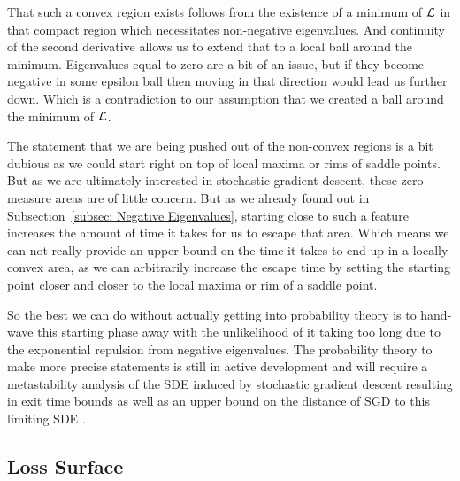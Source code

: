 That such a convex region exists follows from the existence of a minimum of
\(\mathcal{L}\) in that compact region which necessitates non-negative
eigenvalues. And continuity of the second derivative allows us to extend that to 
a local ball around the minimum. Eigenvalues equal to zero
are a bit of an issue, but if they become negative in some epsilon ball
then moving in that direction would lead us further down. Which is a contradiction
to our assumption that we created a ball around the minimum of \(\mathcal{L}\).

The statement that we are being pushed out of the non-convex regions is a bit
dubious as we could start right on top of local maxima or rims of saddle points.
But as we are ultimately interested in stochastic gradient descent, these zero
measure areas are of little concern. But as we already found out in
Subsection~\ref{subsec: Negative Eigenvalues}, starting close to such a feature
increases the amount of time it takes for us to escape that area. Which means
we can not really provide an upper bound on the time it takes to end up in
a locally convex area, as we can arbitrarily increase the escape time by
setting the starting point closer and closer to the local maxima or rim of a
saddle point.

So the best we can do without actually getting into probability theory is to
hand-wave this starting phase away with the unlikelihood of it taking too long
due to the exponential repulsion from negative eigenvalues. The probability
theory to make more precise statements is still in active development and will
require a metastability analysis of the SDE induced by stochastic gradient descent
\parencite[e.g.][]{bovierMetastabilityPotentialTheoreticApproach2015,nguyenFirstExitTime2019}
resulting in exit time bounds as well as an upper bound on the distance of SGD
to this limiting SDE
\parencite[e.g.][]{liStochasticModifiedEquations2017,ankirchnerApproximatingStochasticGradient2021}.

\subsection{Loss Surface}\label{subsec: loss surface}

